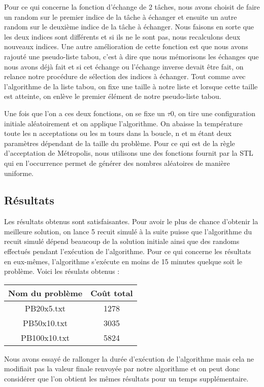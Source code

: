 \documentclass{report}
\begin{document}
Pour ce qui concerne la fonction d'échange de 2 tâches, nous avons choisit de faire un random sur le premier indice de la tâche à échanger et ensuite un autre random sur le deuxième indice de la tâche à échanger. Nous faisons en sorte que les deux indices sont différents et si ils ne le sont pas, nous recalculons deux nouveaux indices. Une autre amélioration de cette fonction est que nous avons rajouté une pseudo-liste tabou, c'est à dire que nous mémorisons les échanges que nous avons déjà fait et si cet échange ou l'échange inverse devait être fait, on relance notre procédure de sélection des indices à échanger. Tout comme avec l'algorithme de la liste tabou, on fixe une taille à notre liste et lorsque cette taille est atteinte, on enlève le premier élément de notre pseudo-liste tabou.

Une fois que l'on a ces deux fonctions, on se fixe un $\tau 0$, on tire une configuration initiale aléatoirement et on applique l'algorithme. On abaisse la température toute les n acceptations ou les m tours dans la boucle, n et m étant deux paramètres dépendant de la taille du problème. Pour ce qui est de la règle d'acceptation de Métropolis, nous utilisons une des fonctions fournit par la STL qui en l'occurrence permet de générer des nombres aléatoires de manière uniforme.

\subsection{Résultats}
Les résultats obtenus sont satisfaisantes. Pour avoir le plus de chance d'obtenir la meilleure solution, on lance 5 recuit simulé à la suite puisse que l'algorithme du recuit simulé dépend beaucoup de la solution initiale ainsi que des randoms effectués pendant l'exécution de l'algorithme. Pour ce qui concerne les résultats en eux-mêmes, l'algorithme s'exécute en moins de 15 minutes quelque soit le problème. Voici les résulats obtenus :\\
\begin{tabular}{|c|c|}
	\hline
	Nom du problème & Coût total\\
	\hline
	PB20x5.txt & 1278 \\
	PB50x10.txt & 3035 \\
	PB100x10.txt & 5824 \\
	\hline
\end{tabular}

Nous avons essayé de rallonger la durée d'exécution de l'algorithme mais cela ne modifiait pas la valeur finale renvoyée par notre algorithme et on peut donc considérer que l'on obtient les mêmes résultats pour un temps supplémentaire.
\end{document}
